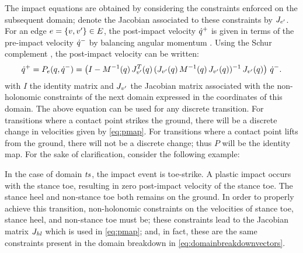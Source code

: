 The impact equations are obtained by considering the constraints enforced on the
subsequent domain;
%
denote the Jacobian associated to these constraints by $J_{e'}$.
%
For an edge $e = \{v, v'\} \in E$, the post-impact velocity $\dot{q}^{+}$ is given
in terms of the pre-impact velocity $\dot{q}^{-}$ by balancing angular momentum
\cite{Hurmuzlu1994}.
%
Using the Schur complement \cite{Zhang2005}, the post-impact velocity can be
written:
%
\begin{align}
  \label{eq:pmap}
  \dot{q}^{+} = P_{e}(q, \dot{q}^{-}) = \left(I - M^{-1}(q) \, J_{v'}^{T}(q) \,
    (J_{v'}(q) \, M^{-1}(q) \, J_{v'}(q))^{-1} \, J_{v'}(q) \right) \,
  \dot{q}^{-}.
\end{align}
%
with $I$ the identity matrix and $J_{v'}$ the Jacobian matrix associated with
the non-holonomic constraints of the next domain expressed in the coordinates of
this domain.
%
The above equation can be used for any discrete transition.
%
For transitions where a contact point strikes the ground, there will be a
discrete change in velocities given by \eqref{eq:pmap}.
%
For transitions where a contact point lifts from the ground, there will not be a
discrete change;
%
thus $P$ will be the identity map.
%
For the sake of clarification, consider the following example:
%
\begin{exmp}
  In the case of domain $\mathit{ts}$, the impact event is toe-strike.
  A plastic impact occurs with the stance toe, resulting in zero post-impact
  velocity of the stance toe.
  The stance heel and non-stance toe both remains on the ground.
  In order to properly achieve this transition, non-holonomic constraints on the
  velocities of stance toe, stance heel, and non-stance toe must be;
  these constraints lead to the Jacobian matrix $J_{\mathit{hl}}$ which is used in
  \eqref{eq:pmap};
  and, in fact, these are the same constraints present in the domain breakdown
  in \eqref{eq:domainbreakdownvectors}.
\end{exmp}

